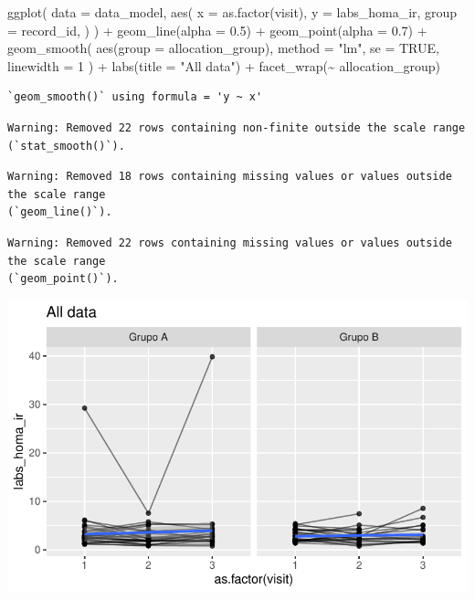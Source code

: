 \documentclass[
  letterpaper,
  DIV=11,
  numbers=noendperiod]{scrartcl}
\newenvironment{Shaded}{\begin{snugshade}}{\end{snugshade}}
\newcommand{\AttributeTok}[1]{\textcolor[rgb]{0.40,0.45,0.13}{#1}}
\newcommand{\ConstantTok}[1]{\textcolor[rgb]{0.56,0.35,0.01}{#1}}
\newcommand{\DecValTok}[1]{\textcolor[rgb]{0.68,0.00,0.00}{#1}}
\newcommand{\FloatTok}[1]{\textcolor[rgb]{0.68,0.00,0.00}{#1}}
\newcommand{\FunctionTok}[1]{\textcolor[rgb]{0.28,0.35,0.67}{#1}}
\newcommand{\NormalTok}[1]{\textcolor[rgb]{0.00,0.23,0.31}{#1}}
\newcommand{\SpecialCharTok}[1]{\textcolor[rgb]{0.37,0.37,0.37}{#1}}
\newcommand{\StringTok}[1]{\textcolor[rgb]{0.13,0.47,0.30}{#1}}
\begin{document}
\begin{Shaded}
\begin{Highlighting}[]
\FunctionTok{ggplot}\NormalTok{(}
    \AttributeTok{data =}\NormalTok{ data\_model, }
    \FunctionTok{aes}\NormalTok{(}
        \AttributeTok{x =} \FunctionTok{as.factor}\NormalTok{(visit),}
        \AttributeTok{y =}\NormalTok{ labs\_homa\_ir,}
        \AttributeTok{group =}\NormalTok{ record\_id,}
\NormalTok{    )}
\NormalTok{) }\SpecialCharTok{+}
    \FunctionTok{geom\_line}\NormalTok{(}\AttributeTok{alpha =} \FloatTok{0.5}\NormalTok{) }\SpecialCharTok{+}
    \FunctionTok{geom\_point}\NormalTok{(}\AttributeTok{alpha =} \FloatTok{0.7}\NormalTok{) }\SpecialCharTok{+}
    \FunctionTok{geom\_smooth}\NormalTok{(}
        \FunctionTok{aes}\NormalTok{(}\AttributeTok{group =}\NormalTok{ allocation\_group),}
        \AttributeTok{method =} \StringTok{"lm"}\NormalTok{,}
        \AttributeTok{se =} \ConstantTok{TRUE}\NormalTok{,}
        \AttributeTok{linewidth =} \DecValTok{1}
\NormalTok{    ) }\SpecialCharTok{+}
    \FunctionTok{labs}\NormalTok{(}\AttributeTok{title =} \StringTok{"All data"}\NormalTok{) }\SpecialCharTok{+}
    \FunctionTok{facet\_wrap}\NormalTok{(}\SpecialCharTok{\textasciitilde{}}\NormalTok{ allocation\_group) }
\end{Highlighting}
\end{Shaded}

\begin{verbatim}
`geom_smooth()` using formula = 'y ~ x'
\end{verbatim}

\begin{verbatim}
Warning: Removed 22 rows containing non-finite outside the scale range
(`stat_smooth()`).
\end{verbatim}

\begin{verbatim}
Warning: Removed 18 rows containing missing values or values outside the scale range
(`geom_line()`).
\end{verbatim}

\begin{verbatim}
Warning: Removed 22 rows containing missing values or values outside the scale range
(`geom_point()`).
\end{verbatim}

\includegraphics{Outcomes_V1V2V3_files/figure-pdf/labs_homa_ir_6-1.pdf}
\end{document}

